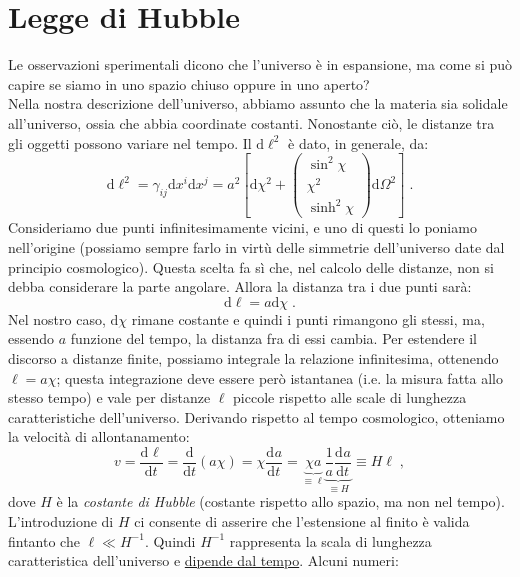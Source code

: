 \documentclass[12pt,a4paper]{report}
\theoremstyle{definition}
\newcommand{\dev}[3][]{\frac{\mathrm{d}^{#1} #2}{\mathrm{d} #3^{#1}}}
\newcommand{\diff}[1][]{\mathrm{d}#1}
\begin{document}
\section{Legge di Hubble}
Le osservazioni sperimentali dicono che l'universo è in espansione, ma come si può capire se siamo in uno spazio chiuso oppure in uno aperto? \\
Nella nostra descrizione dell'universo, abbiamo assunto che la materia sia solidale all'universo, ossia che abbia coordinate costanti. Nonostante ciò, le distanze tra gli oggetti possono variare nel tempo. Il $\diff{\ell}^2$ è dato, in generale, da:
\begin{equation}
\diff{\ell}^2=\gamma_{ij}\diff{x^i}\diff{x^j}=a^2\left[\diff{\chi}^2+\left(\begin{matrix}
\sin^2\chi \\
\chi^2 \\
\sinh^2\chi
\end{matrix}\right)\diff{\Omega}^2\right]\;.
\end{equation}
Consideriamo due punti infinitesimamente vicini, e uno di questi lo poniamo nell'origine (possiamo sempre farlo in virtù delle simmetrie dell'universo date dal principio cosmologico). Questa scelta fa sì che, nel calcolo delle distanze, non si debba considerare la parte angolare. Allora la distanza tra i due punti sarà:
\begin{equation}
\diff{\ell}=a\diff{\chi}\;.
\end{equation}
Nel nostro caso, $\diff{\chi}$ rimane costante e quindi i punti rimangono gli stessi, ma, essendo $a$ funzione del tempo, la distanza fra di essi cambia. Per estendere il discorso a distanze finite, possiamo integrale la relazione infinitesima, ottenendo $\ell=a\chi$; questa integrazione deve essere però istantanea (i.e. la misura fatta allo stesso tempo) e vale per distanze $\ell$ piccole rispetto alle scale di lunghezza caratteristiche dell'universo. Derivando rispetto al tempo cosmologico, otteniamo la velocità di allontanamento:
\begin{equation}
v=\dev{\ell}{t}=\frac{\diff}{\diff{t}}(a\chi)=\chi\dev{a}{t}=\underbrace{\chi a}_{\equiv\ell}\underbrace{\frac{1}{a}\dev{a}{t}}_{\equiv H}\equiv H\ell\;,
\end{equation}
dove $H$ è la \emph{costante di Hubble} (costante rispetto allo spazio, ma non nel tempo). L'introduzione di $H$ ci consente di asserire che l'estensione al finito è valida fintanto che $\ell\ll H^{-1}$. Quindi $H^{-1}$ rappresenta la scala di lunghezza caratteristica dell'universo e \underline{dipende dal tempo}. Alcuni numeri:
\end{document}
